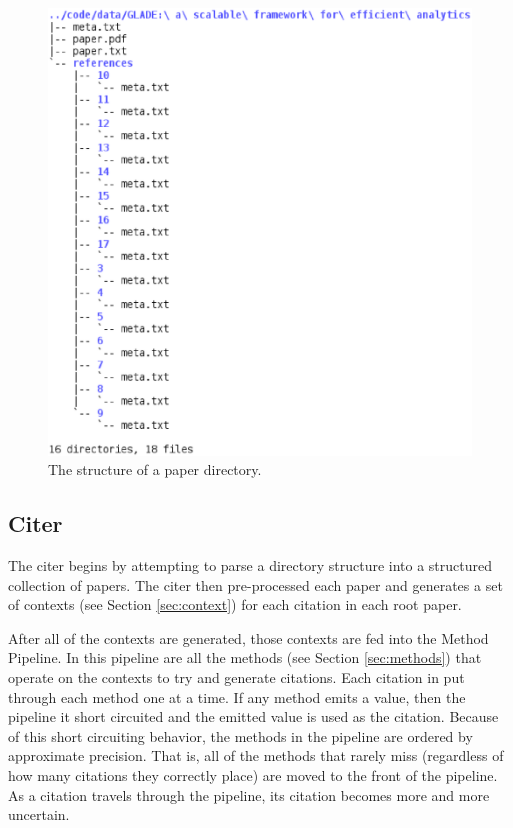 \documentclass[10pt, conference, compsocconf]{IEEEtran}
\begin{document}
\begin{figure}[ht]
   \includegraphics[width=\columnwidth px]{images/tree.eps}
        \caption{The structure of a paper directory.}
        \label{fig:tree}
\end{figure}

\subsection{Citer}\label{sec:archCiter}
The citer begins by attempting to parse a directory structure into a structured collection of papers.
The citer then pre-processed each paper and generates a set of contexts (see Section \ref{sec:context}) for each citation in each
root paper.

After all of the contexts are generated, those contexts are fed into the Method Pipeline. In this pipeline are all the methods (see Section \ref{sec:methods})
that operate on the contexts to try and generate citations. Each citation in put through each method one at a time. If any method emits a value, then the pipeline
it short circuited and the emitted value is used as the citation. Because of this short circuiting behavior, the methods in the pipeline are ordered by approximate
precision. That is, all of the methods that rarely miss (regardless of how many citations they correctly place) are moved to the front of the pipeline.
As a citation travels through the pipeline, its citation becomes more and more uncertain.
\end{document}
